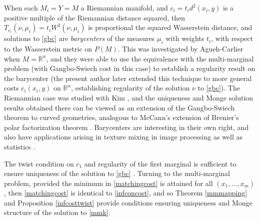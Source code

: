 \documentclass[letter,10pt]{article}
\theoremstyle{dotless}
\begin{document}
When each $M_i=Y=M$ a Riemannian manifold, and $c_i =t_id^2(x_i,y)$ is a positive multiple of the Riemannian distance squared, then $T_{c_i}(\nu,\mu_i) =t_iW^2(\nu,\mu_i)$ is proportional the squared Wasserstein distance, and solutions to \eqref{gbc} are \textit{barycenters} of the measures $\mu_i$ with weights $t_i$, with respect to the Wasserstein metric on $P(M)$.    This was investigated by Agueh-Carlier when $M= \mathbb{R}^n$, and they were able to use the equivalence with the multi-marginal problem (with Gangbo-Swiech cost in this case)  to establish a regularity result on the barycenter \cite{AC} (the present author later extended this technique to more general costs $c_i(x_i,y)$ \cite{P13a} on $\mathbb{R}^n$, establishing regularity of the solution $\nu$ to \eqref{gbc}).   The  Riemannian case was studied with Kim \cite{KP}, and the uniqueness and Monge solution results obtained there can be viewed as an extension of the Gangbo-Swiech theorem \cite{GS} to curved geometries, analogous to McCann's extension \cite{m3} of Brenier's polar factorization theorem \cite{bren}.  Barycenters are interesting in their own right, and also have applications arising in texture mixing in image processing \cite{bdpr} as well as statistics \cite{BK} . 

The twist condition on $c_1$ and regularity of the first marginal is sufficient to ensure uniqueness of the solution to \eqref{gbc} \cite{CE}.  Turning to the multi-marginal problem, provided the minimum in \eqref{matchingcost} is attained for all $(x_1,...,x_m)$, then \eqref{matchingcost} is identical to \eqref{infconcost}, and so Theorem \ref{mmmapping} and Proposition \ref{infcosttwist} provide conditions ensuring uniqueness and Monge structure of the solution to \eqref{mmk}.




\end{document}
